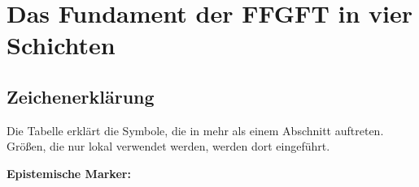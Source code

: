 
\providecommand{\BM}{\textbf{[B]}}
\providecommand{\KM}{\textbf{[K]}}
\providecommand{\SM}{\textbf{[S]}}
\providecommand{\SetzM}{\textbf{[SETZUNG]}}
\providecommand{\QM}{\textbf{[Q]}}
\providecommand{\EM}{\textbf{[E]}}
\providecommand{\XM}{\textbf{[X]}}

\chapter*{Das Fundament der FFGFT in vier Schichten}

\begin{abstract}
Die FFGFT ruht auf vier Schichten, die unterschiedlichen epistemischen Charakter haben.
Schicht~1 (Grundformel und Relativitätsprinzip) und Schicht~2 (elektromagnetischer
Sektor mit $\alpha=1$) sind in natürlichen Einheiten parameterlos und erzeugen die
Struktur. Schicht~3 ($\xi$ als Skalierungsparameter) übersetzt die Struktur in
messbare Größen; sie ist der einzige freie Parameter. Schicht~4 (algebraische
Bestätigungen: Galois-Körper, Hodge-Theorie, Darstellungstheorie) zeigt die Kohärenz
des Systems an bekannter Mathematik, fügt aber keine neuen Eingaben hinzu. Die
Übersetzung in SI-Einheiten und der Vergleich mit dem Standardmodell sind
Kommunikationsarbeit für etablierte Systeme, keine strukturellen Eingaben.
Der kosmische Sektor (H\textsubscript{0}/\ensuremath{\Lambda}) wird ausgeklammert,
weil das Standardmodell ihn ebenso wenig herleitet.
\end{abstract}

\section*{Zeichenerklärung}

Die Tabelle erklärt die Symbole, die in mehr als einem Abschnitt auftreten.
Größen, die nur lokal verwendet werden, werden dort eingeführt.

\medskip
\textbf{Epistemische Marker:}\par


